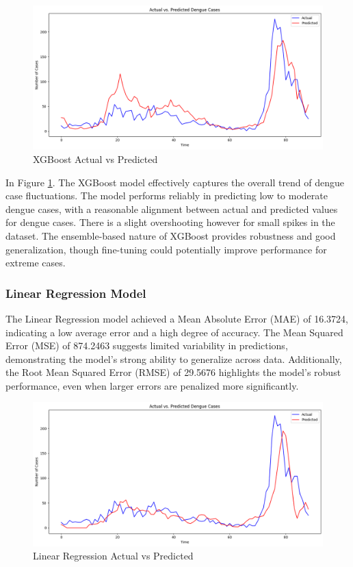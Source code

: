 \documentclass[runningheads]{llncs}
\begin{document}
\begin{figure}[h!]
    \centering
    \includegraphics[width=1\linewidth]{image/XGBoost plot.png}
    \caption{XGBoost Actual vs Predicted}
    \label{fig:xgb}
\end{figure}

In Figure \ref{fig:xgb}. The XGBoost model effectively captures the overall trend of dengue case fluctuations. The model performs reliably in predicting low to moderate dengue cases, with a reasonable alignment between actual and predicted values for dengue cases. There is a slight overshooting however for small spikes in the dataset. The ensemble-based nature of XGBoost provides robustness and good generalization, though fine-tuning could potentially improve performance for extreme cases.

\subsubsection{Linear Regression Model}
The Linear Regression model achieved a Mean Absolute Error (MAE) of 16.3724, indicating a low average error and a high degree of accuracy. The Mean Squared Error (MSE) of 874.2463 suggests limited variability in predictions, demonstrating the model's strong ability to generalize across data. Additionally, the Root Mean Squared Error (RMSE) of 29.5676 highlights the model's robust performance, even when larger errors are penalized more significantly.\\

\begin{figure}[h!]
    \centering
    \includegraphics[width=1\linewidth]{image/Linear Regression plot.png}
    \caption{Linear Regression Actual vs Predicted}
    \label{fig:lr}
\end{figure}
\end{document}
